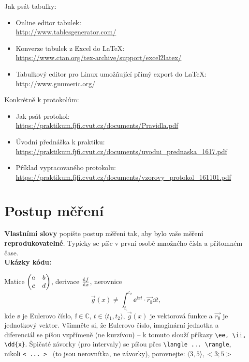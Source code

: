 		Jak psát tabulky:
		\begin{itemize}
		\item Online editor tabulek: \\
				\url{http://www.tablesgenerator.com/}
				\item Konverze tabulek z Excel do \LaTeX:\\
				\url{https://www.ctan.org/tex-archive/support/excel2latex/}
				\item Tabulkový editor pro Linux umožňující přímý export do \LaTeX:\\
				\url{http://www.gnumeric.org/}
		\end{itemize}
		
		Konkrétně k protokolům:
		\begin{itemize}
		\item Jak psát protokol: \\
		\url{https://praktikum.fjfi.cvut.cz/documents/Pravidla.pdf}
		\item Úvodní přednáška k praktiku:\\
		\url{https://praktikum.fjfi.cvut.cz/documents/uvodni_prednaska_1617.pdf}
		\item Příklad vypracovaného protokolu:\\
		\url{https://praktikum.fjfi.cvut.cz/documents/vzorovy_protokol_161101.pdf}
		\end{itemize}


	\section{Postup měření}
	\textbf{Vlastními slovy} popište postup měření tak, aby bylo vaše měření \textbf{reprodukovatelné}. Typicky se píše v první osobě množného čísla a přítomném čase.\\ 
\textbf{Ukázky kódu:}
		
		Matice $	\mqty(a & b \\ c & d)$, derivace $\dv{f}{x} $, nerovnice
		\begin{equation}
			\label{eq:rovnice}
			\vec g(x)\not=\int_{t_1}^{t_2} \ee^{\ii xt}\cdot \vec{r_0}\dd{t},
		\end{equation}
		kde $\ee$ je Eulerovo číslo, $\ii\in\mathbb{C}$, $t\in\langle t_1,t_2\rangle$, $\vec g(x)$ je vektorová funkce a $\vec{r_0}$ je jednotkový vektor. Všimněte si, že Eulerovo číslo, imaginární jednotka a diferenciál se píšou vzpřímeně (ne kurzívou) -- k tomuto slouží příkazy \verb|\ee, \ii, \dd{x}|. Špičaté závorky (pro intervaly) se píšou přes \verb|\langle ... \rangle|, nikoli \verb|< ... > | (to jsou nerovnítka, ne závorky), porovnejte: $\langle 3,5 \rangle, <3;5>$					
		
